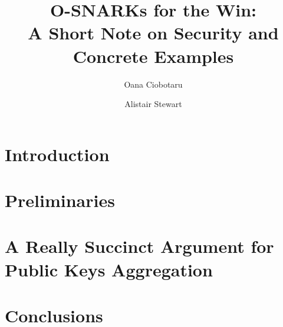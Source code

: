 \documentclass[10pt]{article}
\title{O-SNARKs for the Win: \\
 A Short Note on Security and Concrete Examples}
\author[1]{Oana Ciobotaru}
\author[1]{Alistair Stewart}
\affil[1]{Web3 Foundation}
\begin{document}
   \maketitle

\begin{comment}
\abstract{A major challenge for blockchain interoperability is having an on-chain light client protocol that is both efficient and 
secure. We present a protocol that provides short proofs about the state of a decentralised consensus protocol while being 
able to detect misbehaving parties. To do this naively, a verifier would need to maintain an updated list of all participants' public 
keys which makes the corresponding proofs long. In general, existing solutions either lack accountability or are not efficient. 
We define and design a committee key scheme with short proofs that do not include any of the individual participants' public 
keys in plain. Our committee key scheme, in turn, uses a custom designed SNARK which has a fast prover time. Our committee 
key scheme can be used in an accountable light client system as the main cryptographic core for building bridges between 
proof of stake blockchains. Finally, we implement a prototype of our custom SNARK for which we provide benchmarks.}
\end{comment}
     

\section{Introduction} \label{sec_intro}


\section{Preliminaries} \label{sec_prelims}

%
%
%

%

%
%
%

\section{A Really Succinct Argument for Public Keys Aggregation}\label{sec_apk_proofs}


%

\section{Conclusions}\label{conclusions}


 

\appendix

%

\end{document}
